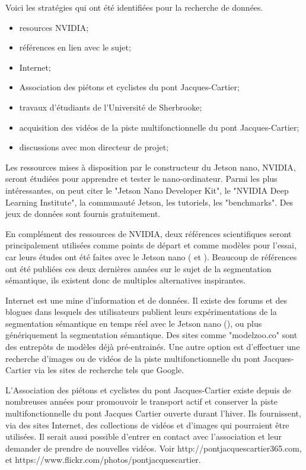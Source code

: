 Voici les stratégies qui ont été identifiées pour la recherche de données.
\begin{itemize}
   \item resources NVIDIA;
   \item références en lien avec le sujet;
   \item Internet;
   \item Association des piétons et cyclistes du pont Jacques-Cartier;
   \item travaux d'étudiants de l'Université de Sherbrooke;
   \item acquisition des vidéos de la piste multifonctionnelle du pont Jacques-Cartier;
   \item discussions avec mon directeur de projet;
\end{itemize}
\vspace{1\baselineskip}
\par Les ressources mises à disposition par le constructeur du Jetson nano, NVIDIA, seront étudiées pour apprendre et tester le nano-ordinateur. Parmi les plus intéressantes, on peut citer le "Jetson Nano Developer Kit", le "NVIDIA Deep Learning Institute", la communauté Jetson, les tutoriels, les "benchmarks". Des jeux de données sont fournis gratuitement.
\par En complément des ressources de NVIDIA, deux références scientifiques seront principalement utilisées comme points de départ et comme modèles pour l'essai, car leurs études ont été faites avec le Jetson nano (\cite{nguyen_mavnet_2019} et \cite{chong_real-time_1992}). Beaucoup de références ont été publiées ces deux dernières années sur le sujet de la segmentation sémantique, ils existent donc de multiples alternatives inspirantes.
\par Internet est une mine d'information et de données. Il existe des forums et des blogues dans lesquels des utilisateurs publient leurs expérimentations de la segmentation sémantique en temps réel avec le Jetson nano (\cite{dustin_realtime_2019}), ou plus génériquement la segmentation sémantique. Des sites comme "modelzoo.co" sont des entrepôts de modèles déjà pré-entrainés. Une autre option est d'effectuer une recherche d'images ou de vidéos de la piste multifonctionnelle du pont Jacques-Cartier via les sites de recherche tels que Google. 
\par L'Association des piétons et cyclistes du pont Jacques-Cartier existe depuis de nombreuses années pour promouvoir le transport actif et conserver la piste multifonctionnelle du pont Jacques Cartier ouverte durant l'hiver. Ils fournissent, via des sites Internet, des collections de vidéos et d'images qui pourraient être utilisées. Il serait aussi possible d'entrer en contact avec l'association et leur demander de prendre de nouvelles vidéos. Voir http://pontjacquescartier365.com, et https://www.flickr.com/photos/pontjacquescartier.
